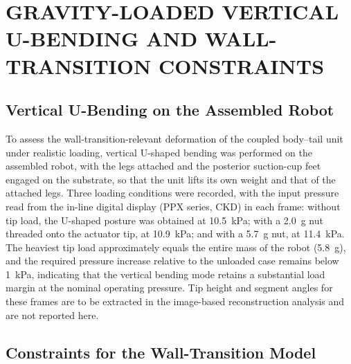 

\section{GRAVITY-LOADED VERTICAL U-BENDING AND WALL-TRANSITION CONSTRAINTS}
\label{sec:lizard-ubend-loads}

\subsection{Vertical U-Bending on the Assembled Robot}

To assess the wall-transition-relevant deformation of the coupled
body--tail unit under realistic loading, vertical U-shaped bending was
performed on the assembled robot, with the legs attached and the
posterior suction-cup feet engaged on the substrate, so that the unit
lifts its own weight and that of the attached legs. Three loading
conditions were recorded, with the input pressure read from the in-line
digital display (PPX series, CKD) in each frame: without tip load, the
U-shaped posture was obtained at 10.5~kPa; with a 2.0~g nut threaded onto
the actuator tip, at 10.9~kPa; and with a 5.7~g nut, at 11.4~kPa. The
heaviest tip load approximately equals the entire mass of the robot
(5.8~g), and the required pressure increase relative to the unloaded case
remains below 1~kPa, indicating that the vertical bending mode retains a
substantial load margin at the nominal operating pressure. Tip height and
segment angles for these frames are to be extracted in the image-based
reconstruction analysis and are not reported here.

\subsection{Constraints for the Wall-Transition Model}

